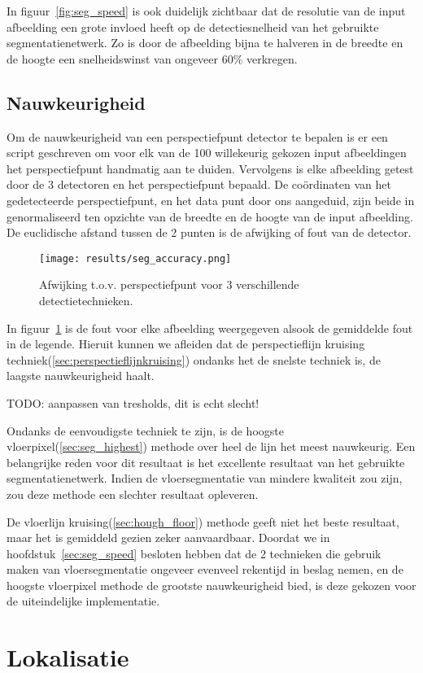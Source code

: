 In figuur~\ref{fig:seg_speed} is ook duidelijk zichtbaar dat de resolutie van de input afbeelding een grote invloed heeft op de detectiesnelheid
van het gebruikte segmentatienetwerk.
Zo is door de afbeelding bijna te halveren in de breedte en de hoogte een snelheidswinst van ongeveer $60\%$ verkregen.


\subsection{Nauwkeurigheid}
Om de nauwkeurigheid van een perspectiefpunt detector te bepalen is er een script geschreven om voor elk van de 100 willekeurig gekozen input afbeeldingen
het perspectiefpunt handmatig aan te duiden.
Vervolgens is elke afbeelding getest door de 3 detectoren en het perspectiefpunt bepaald.
De co\"{o}rdinaten van het gedetecteerde perspectiefpunt, en het data punt door ons aangeduid, zijn beide in genormaliseerd ten opzichte van de breedte en de hoogte van de input afbeelding.
De euclidische afstand tussen de 2 punten is de afwijking of fout van de detector.

\begin{figure}[h]
    \centering
    \texttt{[image: results/seg\_accuracy.png]}
    \caption{Afwijking t.o.v. perspectiefpunt voor 3 verschillende detectietechnieken.}
    \label{fig:seg_accuracy}
\end{figure}

In figuur~\ref{fig:seg_accuracy} is de fout voor elke afbeelding weergegeven alsook de gemiddelde fout in de legende.
Hieruit kunnen we afleiden dat de perspectieflijn kruising techniek(\ref{sec:perspectieflijnkruising}) ondanks het de snelste techniek is, de laagste nauwkeurigheid haalt.

TODO: aanpassen van tresholds, dit is echt slecht!

Ondanks de eenvoudigste techniek te zijn, is de hoogste vloerpixel(\ref{sec:seg_highest}) methode over heel de lijn het meest nauwkeurig.
Een belangrijke reden voor dit resultaat is het excellente resultaat van het gebruikte segmentatienetwerk.
Indien de vloersegmentatie van mindere kwaliteit zou zijn, zou deze methode een slechter resultaat opleveren.

De vloerlijn kruising(\ref{sec:hough_floor}) methode geeft niet het beste resultaat, maar het is gemiddeld gezien zeker aanvaardbaar.
Doordat we in hoofdstuk~\ref{sec:seg_speed} besloten hebben dat de 2 technieken die gebruik maken van vloersegmentatie ongeveer evenveel rekentijd in beslag
nemen, en de hoogste vloerpixel methode de grootste nauwkeurigheid bied, is deze gekozen voor de uiteindelijke implementatie.

\section{Lokalisatie}